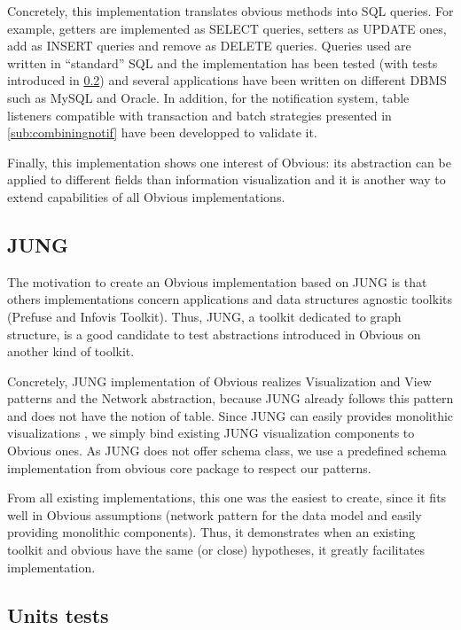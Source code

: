Concretely, this implementation  translates obvious methods into SQL queries. For example, getters are implemented as SELECT queries, setters as UPDATE ones, add as INSERT queries and remove as DELETE queries. Queries used are written in "`standard"' SQL and the implementation has been tested (with tests introduced in \ref{sub:unittests}) and several applications have been written on different DBMS such as MySQL and Oracle. In addition, for the notification system, table listeners compatible with transaction and batch strategies presented in \ref{sub:combiningnotif} have been developped to validate it.

Finally, this implementation shows one interest of Obvious: its abstraction can be applied to different fields than information visualization and it is another way to extend capabilities of all Obvious implementations.

\subsection{JUNG}

The motivation to create an Obvious implementation based on JUNG is that others implementations concern applications and data structures agnostic toolkits (Prefuse and Infovis Toolkit). Thus, JUNG, a toolkit dedicated to graph structure, is a good candidate to test abstractions introduced in Obvious on another kind of toolkit. 

Concretely, JUNG implementation of Obvious realizes Visualization and View patterns and the Network abstraction, because JUNG already follows this pattern and does not have the notion of table. Since JUNG can easily provides monolithic visualizations , we simply bind existing JUNG visualization components to Obvious ones. As JUNG does not offer schema class, we use a predefined schema implementation from obvious core package to respect our patterns.

From all existing implementations, this one was the easiest to create, since it fits well in Obvious assumptions (network pattern for the data model and easily providing monolithic components). Thus, it demonstrates when an existing toolkit and obvious have the same (or close)  hypotheses, it greatly facilitates implementation.

\subsection{Units tests}
\label{sub:unittests}

